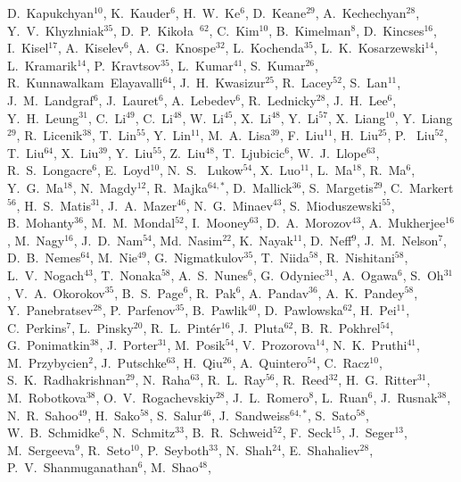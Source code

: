 {D.~Kapukchyan$^{10}$,
K.~Kauder$^{6}$,
H.~W.~Ke$^{6}$,
D.~Keane$^{29}$,
A.~Kechechyan$^{28}$,
Y.~V.~Khyzhniak$^{35}$,
D.~P.~Kiko\l{}a~$^{62}$,
C.~Kim$^{10}$,
B.~Kimelman$^{8}$,
D.~Kincses$^{16}$,
I.~Kisel$^{17}$,
A.~Kiselev$^{6}$,
A.~G.~Knospe$^{32}$,
L.~Kochenda$^{35}$,
L.~K.~Kosarzewski$^{14}$,
L.~Kramarik$^{14}$,
P.~Kravtsov$^{35}$,
L.~Kumar$^{41}$,
S.~Kumar$^{26}$,
R.~Kunnawalkam~Elayavalli$^{64}$,
J.~H.~Kwasizur$^{25}$,
R.~Lacey$^{52}$,
S.~Lan$^{11}$,
J.~M.~Landgraf$^{6}$,
J.~Lauret$^{6}$,
A.~Lebedev$^{6}$,
R.~Lednicky$^{28}$,
J.~H.~Lee$^{6}$,
Y.~H.~Leung$^{31}$,
C.~Li$^{49}$,
C.~Li$^{48}$,
W.~Li$^{45}$,
X.~Li$^{48}$,
Y.~Li$^{57}$,
X.~Liang$^{10}$,
Y.~Liang$^{29}$,
R.~Licenik$^{38}$,
T.~Lin$^{55}$,
Y.~Lin$^{11}$,
M.~A.~Lisa$^{39}$,
F.~Liu$^{11}$,
H.~Liu$^{25}$,
P.~ Liu$^{52}$,
T.~Liu$^{64}$,
X.~Liu$^{39}$,
Y.~Liu$^{55}$,
Z.~Liu$^{48}$,
T.~Ljubicic$^{6}$,
W.~J.~Llope$^{63}$,
R.~S.~Longacre$^{6}$,
E.~Loyd$^{10}$,
N.~S.~ Lukow$^{54}$,
X.~Luo$^{11}$,
L.~Ma$^{18}$,
R.~Ma$^{6}$,
Y.~G.~Ma$^{18}$,
N.~Magdy$^{12}$,
R.~Majka$^{64,*}$,
D.~Mallick$^{36}$,
S.~Margetis$^{29}$,
C.~Markert$^{56}$,
H.~S.~Matis$^{31}$,
J.~A.~Mazer$^{46}$,
N.~G.~Minaev$^{43}$,
S.~Mioduszewski$^{55}$,
B.~Mohanty$^{36}$,
M.~M.~Mondal$^{52}$,
I.~Mooney$^{63}$,
D.~A.~Morozov$^{43}$,
A.~Mukherjee$^{16}$,
M.~Nagy$^{16}$,
J.~D.~Nam$^{54}$,
Md.~Nasim$^{22}$,
K.~Nayak$^{11}$,
D.~Neff$^{9}$,
J.~M.~Nelson$^{7}$,
D.~B.~Nemes$^{64}$,
M.~Nie$^{49}$,
G.~Nigmatkulov$^{35}$,
T.~Niida$^{58}$,
R.~Nishitani$^{58}$,
L.~V.~Nogach$^{43}$,
T.~Nonaka$^{58}$,
A.~S.~Nunes$^{6}$,
G.~Odyniec$^{31}$,
A.~Ogawa$^{6}$,
S.~Oh$^{31}$,
V.~A.~Okorokov$^{35}$,
B.~S.~Page$^{6}$,
R.~Pak$^{6}$,
A.~Pandav$^{36}$,
A.~K.~Pandey$^{58}$,
Y.~Panebratsev$^{28}$,
P.~Parfenov$^{35}$,
B.~Pawlik$^{40}$,
D.~Pawlowska$^{62}$,
H.~Pei$^{11}$,
C.~Perkins$^{7}$,
L.~Pinsky$^{20}$,
R.~L.~Pint\'{e}r$^{16}$,
J.~Pluta$^{62}$,
B.~R.~Pokhrel$^{54}$,
G.~Ponimatkin$^{38}$,
J.~Porter$^{31}$,
M.~Posik$^{54}$,
V.~Prozorova$^{14}$,
N.~K.~Pruthi$^{41}$,
M.~Przybycien$^{2}$,
J.~Putschke$^{63}$,
H.~Qiu$^{26}$,
A.~Quintero$^{54}$,
C.~Racz$^{10}$,
S.~K.~Radhakrishnan$^{29}$,
N.~Raha$^{63}$,
R.~L.~Ray$^{56}$,
R.~Reed$^{32}$,
H.~G.~Ritter$^{31}$,
M.~Robotkova$^{38}$,
O.~V.~Rogachevskiy$^{28}$,
J.~L.~Romero$^{8}$,
L.~Ruan$^{6}$,
J.~Rusnak$^{38}$,
N.~R.~Sahoo$^{49}$,
H.~Sako$^{58}$,
S.~Salur$^{46}$,
J.~Sandweiss$^{64,*}$,
S.~Sato$^{58}$,
W.~B.~Schmidke$^{6}$,
N.~Schmitz$^{33}$,
B.~R.~Schweid$^{52}$,
F.~Seck$^{15}$,
J.~Seger$^{13}$,
M.~Sergeeva$^{9}$,
R.~Seto$^{10}$,
P.~Seyboth$^{33}$,
N.~Shah$^{24}$,
E.~Shahaliev$^{28}$,
P.~V.~Shanmuganathan$^{6}$,
M.~Shao$^{48}$,
}
